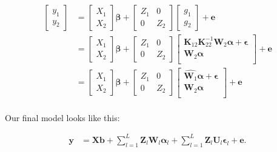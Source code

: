 \documentclass[12pt,titlepage]{article}
\begin{document}
\begin{align} \label{eq:entangled-augmented-single-step-model}
\begin{bmatrix}
  y_1 \\
  y_2 
 \end{bmatrix}
& =
 \begin{bmatrix}
  X_1 \\
  X_2 
 \end{bmatrix}
 \boldsymbol{\beta} + 
 \begin{bmatrix}
  Z_1 & 0 \\
  0 & Z_2 
 \end{bmatrix}
\begin{bmatrix}
  g_1 \\
  g_2 
 \end{bmatrix}
  + \mathbf{e} \\
    & = 
 \begin{bmatrix}
  X_1 \\
  X_2 
 \end{bmatrix}
 \boldsymbol{\beta} + 
 \begin{bmatrix}
  Z_1 & 0 \\
  0 & Z_2 
 \end{bmatrix}
\begin{bmatrix}
  \mathbf{K}_{12}\mathbf{K}_{22}^{-1}\mathbf{W}_2\boldsymbol{\alpha} + \boldsymbol{\epsilon}  \\
  \mathbf{W}_2\boldsymbol{\alpha} \\
 \end{bmatrix}
  + \mathbf{e} \\
    & = 
 \begin{bmatrix}
  X_1 \\
  X_2 
 \end{bmatrix}
 \boldsymbol{\beta} + 
 \begin{bmatrix}
  Z_1 & 0 \\
  0 & Z_2 
 \end{bmatrix}
\begin{bmatrix}
  \hat{\mathbf{W}_1}\boldsymbol{\alpha} + \boldsymbol{\epsilon} \\
  \mathbf{W}_2\boldsymbol{\alpha} \\
 \end{bmatrix}
  + \mathbf{e} \\
\end{align}


Our final model looks like this:

\begin{align} \label{eq:final-model}
\mathbf{y} &= \mathbf{Xb} +
\sum_{l=1}^{L} \mathbf{Z}_{l}\mathbf{W}_{l} \boldsymbol{\alpha}_{l} + 
\sum_{l=1}^{L} \mathbf{Z}_{l}\mathbf{U}_{l} \boldsymbol{\epsilon}_{l} +
\mathbf{e}.
\end{align}
\end{document}
